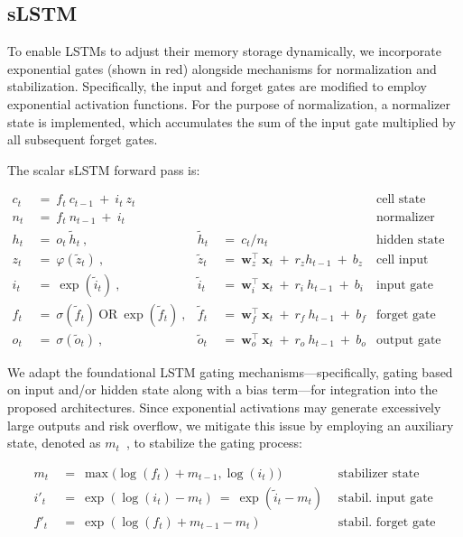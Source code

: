 \subsection{sLSTM}
\label{sec:sLSTM}

To enable LSTMs to adjust their memory storage dynamically, we incorporate exponential gates (shown in red) alongside mechanisms for normalization and stabilization. Specifically, the input and forget gates are modified to employ exponential activation functions. For the purpose of normalization, a normalizer state is implemented, which accumulates the sum of the input gate multiplied by all subsequent forget gates.

The scalar sLSTM forward pass is:

\begin{align}
\label{eq:slstmforward}
c_t \ &= \  f_t \ c_{t-1} \ + \ i_t \ z_t & & 
 &\text{cell state} \\
n_t \ &= \  f_t \ n_{t-1} \ + \ i_t  & & 
 &\text{normalizer state} \\
h_t \ &= \ o_t \ \tilde{h}_t \ ,
  &\tilde{h}_t \ &= \ c_t / n_t
&\text{hidden state} \\
z_t \ &= \ \varphi \left( \tilde{z}_t \right) \ , 
  &\tilde{z}_t \ &=  \ \mathbf{w}^\top_{z} \ \mathbf{x}_t \ + \
  r_{z}  h_{t-1} \ + \  b_{z}
  &\text{cell input} \\
i_t \ &= \ \!\exp \left( \tilde{i}_t  \right) \ , 
  &\tilde{i}_t \ &= \ \mathbf{w}^\top_{i} \ \mathbf{x}_t \ + \
  r_{i}  \ h_{t-1} \ + \  b_{i}
  &\text{input gate} \\
f_t \ &= \ \sigma \left(  \tilde{f}_t \right) \ \text{OR} \
\!\exp \left(  \tilde{f}_t \right) \ ,
  &\tilde{f}_t \ &= \ \mathbf{w}^\top_{f} \ \mathbf{x}_t  \ + \
  r_{f}  \ h_{t-1} \ + \  b_{f}
  &\text{forget gate} \\
o_t \ &= \ \sigma \left( \tilde{o}_t \right) \ , 
  &\tilde{o}_t  \ &= \ \mathbf{w}^\top_{o} \ \mathbf{x}_t \ + \
  r_{o}  \ h_{t-1} \ + \  b_{o}
  &\text{output gate} 
\end{align}

We adapt the foundational LSTM gating mechanisms—specifically, gating based on input and/or hidden state along with a bias term—for integration into the proposed architectures. Since exponential activations may generate excessively large outputs and risk overflow, we mitigate this issue by employing an auxiliary state, denoted as \mbox{$m_t$~\citep{Milakov:18arxiv}}, to stabilize the gating process:

\begin{align}
\label{eq:slstmstabil}
m_t \ &= \ \max \big( \log(f_t) + m_{t-1}, \log(i_t) \big) &\text{stabilizer state} \\
i'_t \ &= \ \!\exp \left( \log(i_t) - m_t \right) \ = \ \!\exp \left( \tilde{i}_t - m_t \right) \ \, 
  &\text{stabil. input gate} \\
f'_t \ &= \ \!\exp \left( \log(f_t) + m_{t-1} - m_t \right) \ \, 
  &\text{stabil. forget gate}
\end{align}

